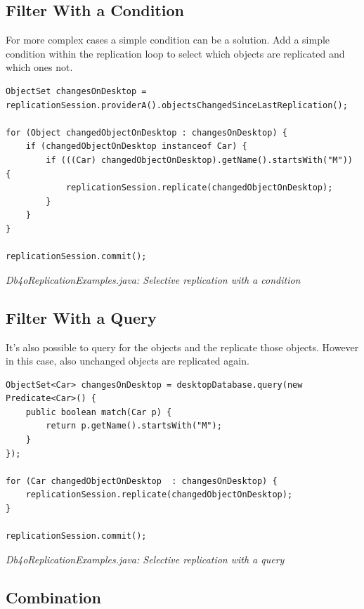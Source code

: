 \subsection*{Filter With a Condition}

For more complex cases a simple condition can be a solution. Add a simple condition within the replication loop to select which objects are replicated and which ones not.

\begin{lstlisting}
ObjectSet changesOnDesktop = replicationSession.providerA().objectsChangedSinceLastReplication();

for (Object changedObjectOnDesktop : changesOnDesktop) {
    if (changedObjectOnDesktop instanceof Car) {
        if (((Car) changedObjectOnDesktop).getName().startsWith("M")) {
            replicationSession.replicate(changedObjectOnDesktop);
        }
    }            
}

replicationSession.commit();
\end{lstlisting}

{\small\itshape Db4oReplicationExamples.java: Selective replication with a condition\par}
\medskip

\subsection*{Filter With a Query}

It's also possible to query for the objects and the replicate those objects. However in this case, also unchanged objects are replicated again.

\begin{lstlisting}
ObjectSet<Car> changesOnDesktop = desktopDatabase.query(new Predicate<Car>() {
    public boolean match(Car p) {
        return p.getName().startsWith("M");
    }
});

for (Car changedObjectOnDesktop  : changesOnDesktop) {
    replicationSession.replicate(changedObjectOnDesktop);
}

replicationSession.commit();
\end{lstlisting}

{\small\itshape Db4oReplicationExamples.java: Selective replication with a query\par}
\medskip

\subsection*{Combination}

